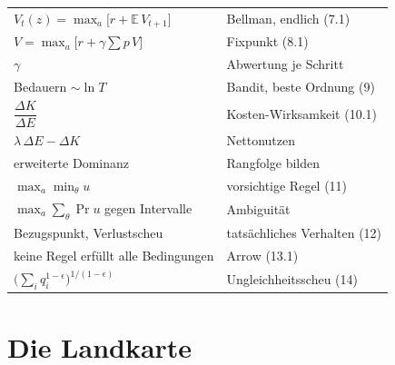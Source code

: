 \begin{merksatz}
\begin{center}
{\small
\renewcommand{\arraystretch}{1.6}
\begin{tabular}{@{}P{4.4cm}P{4.2cm}@{}}
\toprule
$V_t(z) = \max_a \bigl[r + \mathbb{E}\,V_{t+1}\bigr]$ & Bellman, endlich (7.1)\\
$V = \max_a \bigl[r + \gamma\sum p\,V\bigr]$ & Fixpunkt (8.1)\\
$\gamma$ & Abwertung je Schritt\\
Bedauern $\sim \ln T$ & Bandit, beste Ordnung (9)\\
$\dfrac{\Delta K}{\Delta E}$ & Kosten-Wirksamkeit (10.1)\\
$\lambda\,\Delta E - \Delta K$ & Nettonutzen\\
erweiterte Dominanz & Rangfolge bilden\\
$\max_a \min_\theta u$ & vorsichtige Regel (11)\\
$\max_a \sum_\theta \Pr u$ gegen Intervalle & Ambiguität\\
Bezugspunkt, Verlustscheu & tatsächliches Verhalten (12)\\
keine Regel erfüllt alle Bedingungen & Arrow (13.1)\\
$\bigl(\sum_i q_i^{1-\epsilon}\bigr)^{1/(1-\epsilon)}$ & Ungleichheitsscheu (14)\\
\bottomrule
\end{tabular}}
\end{center}
\end{merksatz}

\section{Die Landkarte}

